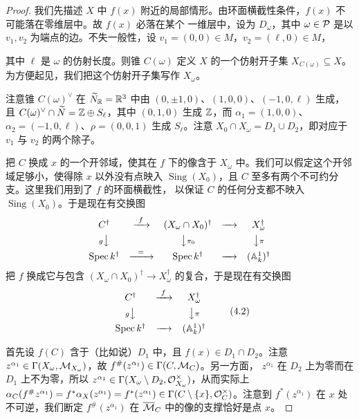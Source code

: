 \begin{proof}
我们先描述 $X$ 中 $f(x)$ 附近的局部情形。由环面横截性条件，$f(x)$ 不可能落在零维层中。故 $f(x)$ 必落在某个
一维层中，设为 $D_\omega$，其中 $\omega\in\mathcal{P}$ 是以 $v_1,v_2$ 为端点的边。不失一般性，设
$v_1 = (0,0)\in M$，$v_2 = (\ell,0)\in M$，

其中 $\ell$ 是 $\omega$ 的仿射长度。则锥 $C(\omega)$ 定义 $X$ 的一个仿射开子集
$X_{C(\omega)} \subseteq X$。为方便起见，我们把这个仿射开子集写作 $X_\omega$。

注意锥 $C(\omega)^\vee$ 在 $\widetilde{N}_{\mathbb{R}} = \mathbb{R}^3$ 中由 $(0,\pm1,0)$、$(1,0,0)$、$(-1,0,\ell)$ 生成，且
$C(\omega)^\vee\cap\widetilde{N} = \mathbb{Z}\oplus S_\ell$，其中 $(0,1,0)$ 生成 $\mathbb{Z}$，而
$\alpha_1 = (1,0,0)$、$\alpha_2 = (-1,0,\ell)$、$\rho = (0,0,1)$ 生成 $S_\ell$。注意
$X_0\cap X_\omega = D_1\cup D_2$，即对应于 $v_1$ 与 $v_2$ 的两个除子。

把 $C$ 换成 $x$ 的一个开邻域，使其在 $f$ 下的像含于 $X_\omega$ 中。我们可以假定这个开邻域足够小，使得除 $x$
以外没有点映入 $\operatorname{Sing}(X_0)$，且 $C$ 至多有两个不可约分支。这里我们用到了 $f$ 的环面横截性，
以保证 $C$ 的任何分支都不映入 $\operatorname{Sing}(X_0)$。于是现在有交换图
\[
\begin{array}{ccccc}
C^{\dagger} & \xrightarrow{\ f\ } & (X_\omega\cap X_0)^{\dagger} & \xrightarrow{\quad} & X_\omega^{\dagger} \\[4pt]
{\scriptstyle g}\big\downarrow & & \big\downarrow{\scriptstyle \pi_0} & & \big\downarrow{\scriptstyle \pi} \\[4pt]
\operatorname{Spec}k^{\dagger} & \xrightarrow{\ \ =\ \ } & \operatorname{Spec}k^{\dagger} & \xrightarrow{\quad} & (\mathbb{A}^1_{k})^{\dagger}
\end{array}
\]
把 $f$ 换成它与包含 $(X_\omega\cap X_0)^{\dagger} \to X_\omega^{\dagger}$ 的复合，于是现在有交换图
\begin{equation}
\begin{array}{ccc}
C^{\dagger} & \xrightarrow{\ f\ } & X_\omega^{\dagger} \\[4pt]
{\scriptstyle g}\big\downarrow & & \big\downarrow{\scriptstyle \pi} \\[4pt]
\operatorname{Spec}k^{\dagger} & \xrightarrow{\quad} & (\mathbb{A}^1_{k})^{\dagger}
\end{array}
\tag{4.2}
\end{equation}

首先设 $f(C)$ 含于（比如说）$D_1$ 中，且 $f(x)\in D_1\cap D_2$。注意
$z^{\alpha_1}\in\Gamma(X_\omega,\mathcal{M}_{X_\omega})$，故 $f^{\#}(z^{\alpha_1})\in\Gamma(C,\mathcal{M}_C)$。另一方面，
$z^{\alpha_1}$ 在 $D_2$ 上为零而在 $D_1$ 上不为零，所以
$z^{\alpha_1}\in\Gamma(X_\omega\setminus D_2,\mathcal{O}^{\times}_{X_\omega})$，从而实际上
$\alpha_C(f^{\#}z^{\alpha_1}) = f^*\alpha_X(z^{\alpha_1}) = f^*(z^{\alpha_1})
\in\Gamma(C\setminus\{x\},\mathcal{O}_C^{\times})$。注意到 $f^*(z^{\alpha_1})$ 在 $x$ 处不可逆，我们断定
$f^{\#}(z^{\alpha_1})$ 在 $\overline{\mathcal{M}}_C$ 中的像的支撑恰好是点 $x$。


\end{proof}
